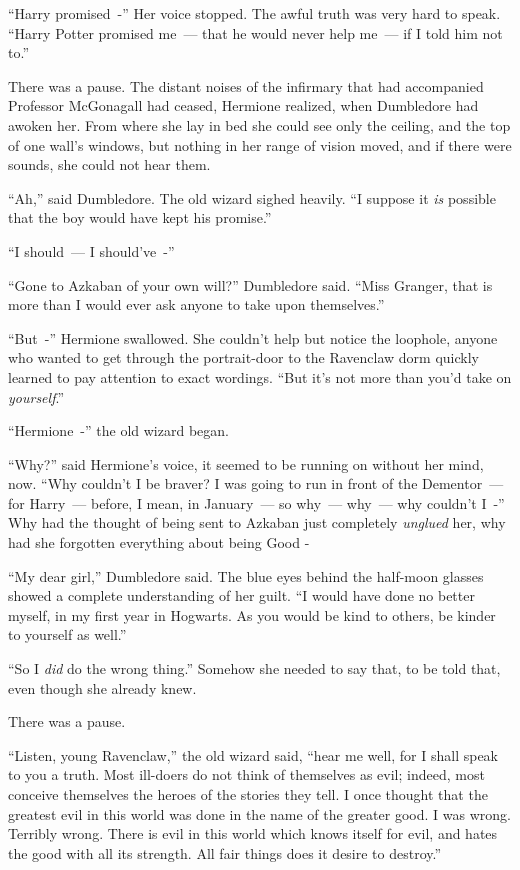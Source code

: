 ``Harry promised~-'' Her voice stopped. The awful truth was very hard to speak. ``Harry Potter promised me~--- that he would never help me~--- if I told him not to.''

There was a pause. The distant noises of the infirmary that had accompanied Professor McGonagall had ceased, Hermione realized, when Dumbledore had awoken her. From where she lay in bed she could see only the ceiling, and the top of one wall's windows, but nothing in her range of vision moved, and if there were sounds, she could not hear them.

``Ah,'' said Dumbledore. The old wizard sighed heavily. ``I suppose it \emph{is} possible that the boy would have kept his promise.''

``I should~--- I should've~-''

``Gone to Azkaban of your own will?'' Dumbledore said. ``Miss Granger, that is more than I would ever ask anyone to take upon themselves.''

``But~-'' Hermione swallowed. She couldn't help but notice the loophole, anyone who wanted to get through the portrait-door to the Ravenclaw dorm quickly learned to pay attention to exact wordings. ``But it's not more than you'd take on \emph{yourself}.''

``Hermione~-'' the old wizard began.

``Why?'' said Hermione's voice, it seemed to be running on without her mind, now. ``Why couldn't I be braver? I was going to run in front of the Dementor~--- for Harry~--- before, I mean, in January~--- so why~--- why~--- why couldn't I~-'' Why had the thought of being sent to Azkaban just completely \emph{unglued} her, why had she forgotten everything about being Good -

``My dear girl,'' Dumbledore said. The blue eyes behind the half-moon glasses showed a complete understanding of her guilt. ``I would have done no better myself, in my first year in Hogwarts. As you would be kind to others, be kinder to yourself as well.''

``So I \emph{did} do the wrong thing.'' Somehow she needed to say that, to be told that, even though she already knew.

There was a pause.

``Listen, young Ravenclaw,'' the old wizard said, ``hear me well, for I shall speak to you a truth. Most ill-doers do not think of themselves as evil; indeed, most conceive themselves the heroes of the stories they tell. I once thought that the greatest evil in this world was done in the name of the greater good. I was wrong. Terribly wrong. There is evil in this world which knows itself for evil, and hates the good with all its strength. All fair things does it desire to destroy.''

